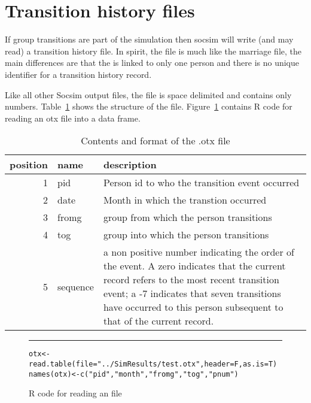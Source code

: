 
\section{Transition history files}

If group transitions are part of the simulation then socsim will write
(and may read) a transition history file.  In spirit, the 
file is much like the marriage file, the main differences are that the
 is linked to only one person and there is no unique
identifier for a transition history record.

Like all other Socsim output files, the  file is space
delimited and contains only numbers. Table~\ref{tab:otxformat} shows
the structure of the  file. Figure~\ref{fig:otxread} contains
R code for reading an otx file into a data frame.



  \begin{table}[h]
    \centering
    \begin{tabular*}{.8\textwidth}{||r|l|p{6cm} ||}
      \hline
      \textbf{position}&\textbf{name}&\textbf{description}\\
\hline \hline
      1&pid& Person id to who the transition event occurred\\
      2&date&Month in which the transtion occurred\\
      3&fromg&group from which the person transitions\\
      4&tog&group into which the person transitions\\
      5&sequence& a non positive number indicating the order of the
      event. A zero indicates that the current record refers to the
      most recent transition event; a -7 
      indicates that seven transitions have occurred to this person
      subsequent to that of the current record.\\
      \hline
    \end{tabular*}
    \caption{Contents and format of the .otx file}
    \label{tab:otxformat}
  \end{table}




  \begin{figure}[h]
    \centering
\vspace{.25cm}
\rule{.5\textwidth}{.1mm}

\begin{verbatim}
otx<-read.table(file="../SimResults/test.otx",header=F,as.is=T)
names(otx)<-c("pid","month","fromg","tog","pnum")

\end{verbatim}
    \caption{R code for reading an   file}
    \label{fig:otxread}
  \end{figure}

